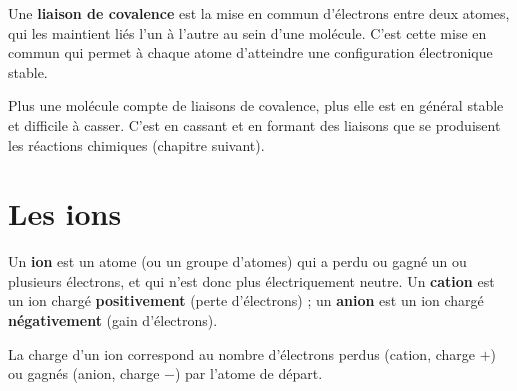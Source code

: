 \begin{definition}
Une \textbf{liaison de covalence} est la mise en commun d'électrons entre deux atomes, qui
les maintient liés l'un à l'autre au sein d'une molécule. C'est cette mise en commun qui
permet à chaque atome d'atteindre une configuration électronique stable.
\end{definition}

\begin{illus}
\end{illus}

\begin{remarque}
Plus une molécule compte de liaisons de covalence, plus elle est en général stable et
difficile à casser. C'est en cassant et en formant des liaisons que se produisent les
réactions chimiques (chapitre suivant).
\end{remarque}

\section{Les ions}

\begin{definition}
Un \textbf{ion} est un atome (ou un groupe d'atomes) qui a perdu ou gagné un ou plusieurs
électrons, et qui n'est donc plus électriquement neutre. Un \textbf{cation} est un ion
chargé \textbf{positivement} (perte d'électrons) ; un \textbf{anion} est un ion chargé
\textbf{négativement} (gain d'électrons).
\end{definition}

\begin{propriete}
La charge d'un ion correspond au nombre d'électrons perdus (cation, charge $+$) ou gagnés
(anion, charge $-$) par l'atome de départ.
\end{propriete}

